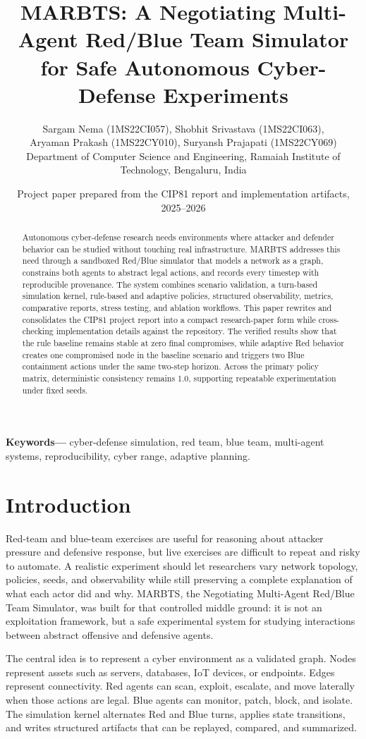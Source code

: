 \documentclass[10pt,twocolumn]{article}
\title{\textbf{MARBTS: A Negotiating Multi-Agent Red/Blue Team Simulator for Safe Autonomous Cyber-Defense Experiments}}
\author{
\begin{tabular}{c}
Sargam Nema (1MS22CI057), Shobhit Srivastava (1MS22CI063),\\
Aryaman Prakash (1MS22CY010), Suryansh Prajapati (1MS22CY069)\\
\small Department of Computer Science and Engineering, Ramaiah Institute of Technology, Bengaluru, India
\end{tabular}
}
\date{Project paper prepared from the CIP81 report and implementation artifacts, 2025--2026}
\begin{document}
\maketitle

\begin{abstract}
Autonomous cyber-defense research needs environments where attacker and defender behavior can be studied without touching real infrastructure. MARBTS addresses this need through a sandboxed Red/Blue simulator that models a network as a graph, constrains both agents to abstract legal actions, and records every timestep with reproducible provenance. The system combines scenario validation, a turn-based simulation kernel, rule-based and adaptive policies, structured observability, metrics, comparative reports, stress testing, and ablation workflows. This paper rewrites and consolidates the CIP81 project report into a compact research-paper form while cross-checking implementation details against the repository. The verified results show that the rule baseline remains stable at zero final compromises, while adaptive Red behavior creates one compromised node in the baseline scenario and triggers two Blue containment actions under the same two-step horizon. Across the primary policy matrix, deterministic consistency remains 1.0, supporting repeatable experimentation under fixed seeds.
\end{abstract}

\textbf{Keywords---} cyber-defense simulation, red team, blue team, multi-agent systems, reproducibility, cyber range, adaptive planning.

\section{Introduction}
Red-team and blue-team exercises are useful for reasoning about attacker pressure and defensive response, but live exercises are difficult to repeat and risky to automate. A realistic experiment should let researchers vary network topology, policies, seeds, and observability while still preserving a complete explanation of what each actor did and why. MARBTS, the Negotiating Multi-Agent Red/Blue Team Simulator, was built for that controlled middle ground: it is not an exploitation framework, but a safe experimental system for studying interactions between abstract offensive and defensive agents.

The central idea is to represent a cyber environment as a validated graph. Nodes represent assets such as servers, databases, IoT devices, or endpoints. Edges represent connectivity. Red agents can scan, exploit, escalate, and move laterally when those actions are legal. Blue agents can monitor, patch, block, and isolate. The simulation kernel alternates Red and Blue turns, applies state transitions, and writes structured artifacts that can be replayed, compared, and summarized.
\end{document}

